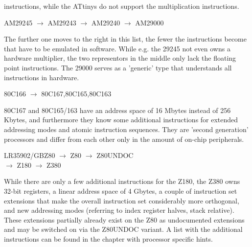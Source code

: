 \documentclass[12pt,twoside]{report}
\begin{document}
instructions, while the ATtinys do not support the multiplication
instructions.
\begin{cpulist}
   AM29245 $\rightarrow$ AM29243 $\rightarrow$ AM29240 $\rightarrow$ AM29000
\end{cpulist}
The further one moves to the right in this list, the fewer the
instructions become that have to be emulated in software.  While e.g.
the 29245 not even owns a hardware multiplier, the two representors in
the middle only lack the floating point instructions.  The 29000
serves as a 'generic' type that understands all instructions in
hardware.
\begin{cpulist}
   80C166 $\rightarrow$ 80C167,80C165,80C163
\end{cpulist}
80C167 and 80C165/163 have an address space of 16 Mbytes instead of 256
Kbytes, and furthermore they know some additional instructions for
extended addressing modes and atomic instruction sequences.  They are
'second generation' processors and differ from each other only in the
amount of on-chip peripherals.
\begin{cpulist}
   LR35902/GBZ80 $\rightarrow$ Z80 $\rightarrow$ Z80UNDOC \\
\> $\rightarrow$ Z180 $\rightarrow$ Z380
\end{cpulist}
While there are only a few additional instructions for the Z180, the
Z380 owns 32-bit registers, a linear address space of 4 Gbytes, a
couple of instruction set extensions that make the overall
instruction set considerably more orthogonal, and new addressing
modes (referring to index register halves, stack relative).  These
extensions partially already exist on the Z80 as undocumented
extensions and may be switched on via the Z80UNDOC variant.  A list
with the additional instructions can be found in the chapter
with processor specific hints.
\end{document}
